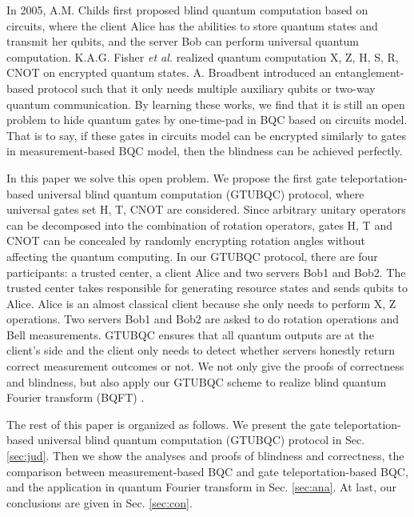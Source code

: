 \documentclass[aps,pra,showpacs,twocolumn,superscriptaddress]{revtex4-1}
\begin{document}
In 2005, A.M. Childs \cite{Childs2005} first proposed blind quantum computation based on circuits, where the client Alice has the abilities to store quantum states and transmit her qubits, and the server Bob can perform universal quantum computation. K.A.G. Fisher \emph{et al.} \cite{22Fisher2014} realized quantum computation X, Z, H, S, R, CNOT on encrypted quantum states. A. Broadbent \cite{Broa15} introduced an entanglement-based protocol such that it only needs multiple auxiliary qubits or two-way quantum communication. By learning these works, we find that it is still an open problem to hide quantum gates by one-time-pad in BQC based on circuits model. That is to say, if these gates in circuits model can be encrypted similarly to gates in measurement-based BQC model, then the blindness can be achieved perfectly.

In this paper we solve this open problem. We propose the first gate teleportation-based universal blind quantum computation (GTUBQC) protocol, where universal gates set H, T, CNOT are considered. Since arbitrary unitary operators can be decomposed into the combination of rotation operators, gates H, T and CNOT can be concealed by randomly encrypting rotation angles without affecting the quantum computing. In our GTUBQC protocol, there are four participants: a trusted center, a client Alice and two servers Bob1 and Bob2. The trusted center takes responsible for generating resource states and sends qubits to Alice. Alice is an almost classical client because she only needs to perform X, Z operations. Two servers Bob1 and Bob2 are asked to do rotation operations and Bell measurements. GTUBQC ensures that all quantum outputs are at the client's side and the client only needs to detect whether servers honestly return correct measurement outcomes or not. We not only give the proofs of correctness and blindness, but also apply our GTUBQC scheme to realize blind quantum Fourier transform (BQFT) \cite{Marq10,Nam14,Lid17,Moore06}.

The rest of this paper is organized as follows. We present the gate teleportation-based universal blind quantum computation (GTUBQC) protocol in Sec. \ref{sec:jud}. Then we show the analyses and proofs of blindness and correctness, the comparison between measurement-based BQC and gate teleportation-based BQC, and the application in quantum Fourier transform in Sec. \ref{sec:ana}. At last, our conclusions are given in Sec. \ref{sec:con}.
\end{document}
